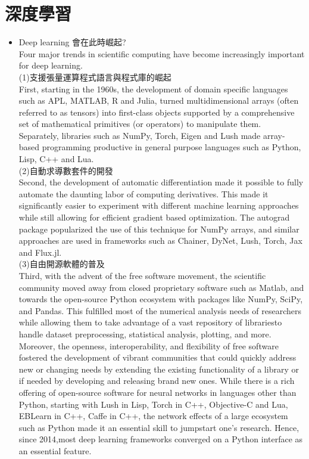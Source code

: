 \documentclass[14pt,a4paper]{report}  %
\begin{document}
\section{深度學習}
\begin{itemize}
\item Deep learning 會在此時崛起?\\
\qquad Four major trends in scientific computing have become increasingly important for deep learning.\\

(1)\quad 支援張量運算程式語言與程式庫的崛起\\ First, starting in the 1960s, the development of domain specific languages such as APL, MATLAB, R and Julia, turned multidimensional arrays (often referred to as tensors) into first-class objects supported by a comprehensive set of mathematical primitives (or operators) to manipulate them.\\
Separately, libraries such as NumPy, Torch, Eigen and Lush made array-based programming productive in general purpose languages such as Python, Lisp, C++ and Lua.\\

(2)\quad 自動求導數套件的開發\\ Second, the development of automatic differentiation made it possible to fully automate the daunting labor of computing derivatives. This made it significantly easier to experiment with different machine learning approaches while still allowing for efficient gradient based optimization. The autograd package popularized the use of this technique for NumPy arrays, and similar approaches are used in frameworks such as Chainer, DyNet, Lush, Torch, Jax and Flux.jl.\\

(3)\quad 自由開源軟體的普及\\ Third, with the advent of the free software movement, the scientific community moved away from closed proprietary software such as Matlab, and towards the open-source Python ecosystem with packages like NumPy, SciPy, and Pandas. This fulfilled most of the numerical analysis needs of researchers while allowing them to take advantage of a vast repository of librariesto handle dataset preprocessing, statistical analysis, plotting, and more.\\
Moreover, the openness, interoperability, and flexibility of free software fostered the development of vibrant communities that could quickly address new or changing needs by extending the existing functionality of a library or if needed by developing and releasing brand new ones. While there is a rich offering of open-source software for neural networks in languages other than Python, starting with Lush in Lisp, Torch in C++, Objective-C and Lua, EBLearn in C++, Caffe in C++, the network effects of a large ecosystem such as Python made it an essential skill to jumpstart one’s research. Hence, since 2014,most deep learning frameworks converged on a Python interface as an essential feature.\\


\end{itemize}
\end{document}
